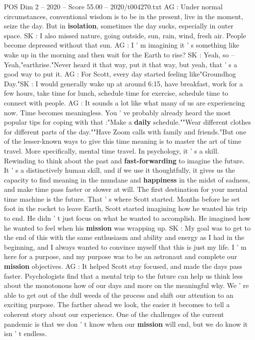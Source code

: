 \begin{textsample}{POS Dim 2 – 2020 – Score 55.00 – 2020/t004270.txt}
AG : Under normal circumstances, conventional wisdom is to be in the present, live in the moment, seize the day.
But in \textbf{isolation}, sometimes the day sucks, especially in outer space.
SK : I also missed nature, going outside, sun, rain, wind, fresh air.
People become depressed without that sun.
AG : I ' m imagining it ' s something like wake up in the morning and then wait for the Earth to rise?
SK : Yeah, so -- Yeah,"earthrise."Never heard it that way, put it that way, but yeah, that ' s a good way to put it.
AG : For Scott, every day started feeling like"Groundhog Day."SK : I would generally wake up at around 6:15, have breakfast, work for a few hours, take time for lunch, schedule time for exercise, schedule time to connect with people.
AG : It sounds a lot like what many of us are experiencing now.
Time becomes meaningless.
You ' ve probably already heard the most popular tips for coping with that :"Make a \textbf{daily} schedule.""Wear different clothes for different parts of the day.""Have Zoom calls with family and friends."But one of the lesser-known ways to give this time meaning is to master the art of time travel.
More specifically, mental time travel.
In psychology, it ' s a skill.
Rewinding to think about the past and \textbf{fast-forwarding} to imagine the future.
It ' s a distinctively human skill, and if we use it thoughtfully, it gives us the capacity to find meaning in the mundane and \textbf{happiness} in the midst of sadness, and make time pass faster or slower at will.
The first destination for your mental time machine is the future.
That ' s where Scott started.
Months before he set foot in the rocket to leave Earth, Scott started imagining how he wanted his trip to end.
He didn ' t just focus on what he wanted to accomplish.
He imagined how he wanted to feel when his \textbf{mission} was wrapping up.
SK : My goal was to get to the end of this with the same enthusiasm and ability and energy as I had in the beginning, and I always wanted to convince myself that this is just my life.
I ' m here for a purpose, and my purpose was to be an astronaut and complete our \textbf{mission} objectives.
AG : It helped Scott stay focused, and made the days pass faster.
Psychologists find that a mental trip to the future can help us think less about the monotonous how of our days and more on the meaningful why.
We ' re able to get out of the dull weeds of the process and shift our attention to an exciting purpose.
The farther ahead we look, the easier it becomes to tell a coherent story about our experience.
One of the challenges of the current pandemic is that we don ' t know when our \textbf{mission} will end, but we do know it isn ' t endless.

\end{textsample}
